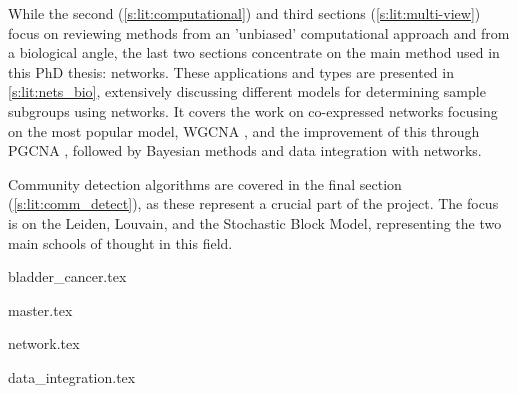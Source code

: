 While the second (\cref{s:lit:computational}) and third sections (\cref{s:lit:multi-view}) focus on reviewing methods from an 'unbiased' computational approach and from a biological angle, the last two sections concentrate on the main method used in this PhD thesis: networks. These applications and types are presented in \cref{s:lit:nets_bio}, extensively discussing different models for determining sample subgroups using networks. It covers the work on co-expressed networks focusing on the most popular model, WGCNA \cite{Langfelder2008-sn}, and the improvement of this through PGCNA \cite{Care2019-ij}, followed by Bayesian methods and data integration with networks.

Community detection algorithms are covered in the final section (\cref{s:lit:comm_detect}), as these represent a crucial part of the project. The focus is on the Leiden, Louvain, and the Stochastic Block Model, representing the two main schools of thought in this field.


{bladder_cancer.tex}

\pagebreak

{master.tex}

{network.tex}

{data_integration.tex}


